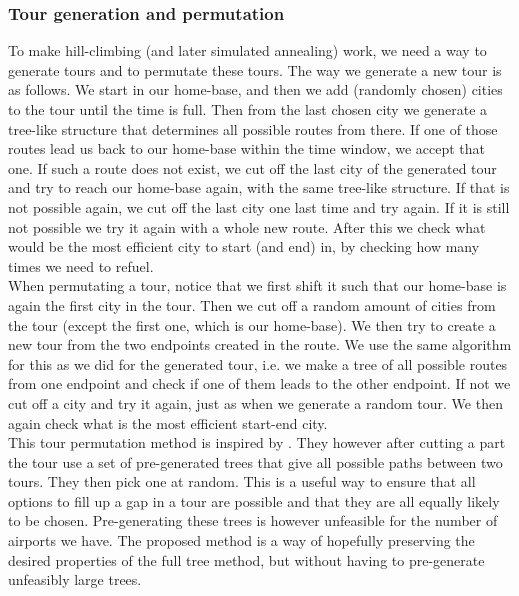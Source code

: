 \documentclass[journal]{IEEEtran}
\begin{document}
\subsubsection{Tour generation and permutation}
To make hill-climbing (and later simulated annealing) work, we need a way to generate tours and to permutate these tours. The way we generate a new tour is as follows. We start in our home-base, and then we add (randomly chosen) cities to the tour until the time is full. Then from the last chosen city we generate a tree-like structure that determines all possible routes from there. If one of those routes lead us back to our home-base within the time window, we accept that one. If such a route does not exist, we cut off the last city of the generated tour and try to reach our home-base again, with the same tree-like structure. If that is not possible again, we cut off the last city one last time and try again. If it is still not possible we try it again with a whole new route. After this we check what would be the most efficient city to start (and end) in, by checking how many times we need to refuel. \\
When permutating a tour, notice that we first shift it such that our home-base is again the first city in the tour. Then we cut off a random amount of cities from the tour (except the first one, which is our home-base). We then try to create a new tour from the two endpoints created in the route. We use the same algorithm for this as we did for the generated tour, i.e. we make a tree of all possible routes from one endpoint and check if one of them leads to the other endpoint. If not we cut off a city and try it again, just as when we generate a random tour. We then again check what is the most efficient start-end city.\\
This tour permutation method is inspired by \cite{Mashford2001}. They however after cutting a part the tour use a set of pre-generated trees that give all possible paths between two tours. They then pick one at random. This is a useful way to ensure that all options to fill up a gap in a tour are possible and that they are all equally likely to be chosen. Pre-generating these trees is however unfeasible for the number of airports we have. The proposed method is a way of hopefully preserving the desired properties of the full tree method, but without having to pre-generate unfeasibly large trees.
\end{document}
